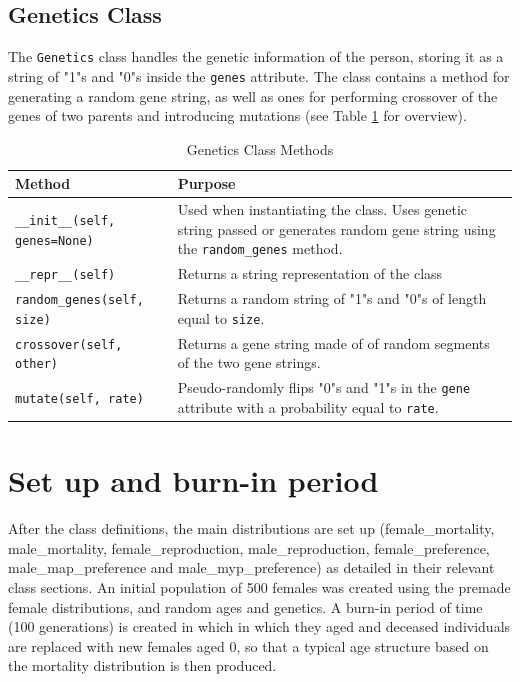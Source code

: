 \documentclass[authoryearcitations]{UoYCSproject}
\begin{document}
\newpage
\subsection{Genetics Class}
The \texttt{Genetics} class handles the genetic information of the person, storing it as a string of "1"s and "0"s inside the \texttt{genes} attribute. The class contains a method for generating a random gene string, as well as ones for performing crossover of the genes of two parents and introducing mutations (see Table \ref{tbl:geneticsMethods} for overview).

\begin{table}[h]
\caption{Genetics Class Methods}
\label{tbl:geneticsMethods}
\begin{tabular}{m{} m{}}
\textbf{Method} & \textbf{Purpose} \\\hline
\texttt{\_\_init\_\_(self, genes=None)} & Used when instantiating the class. Uses genetic string passed or generates random gene string using the \texttt{random\_genes} method.\\\hline
\texttt{\_\_repr\_\_(self)} & Returns a string representation of the class \\\hline
\texttt{random\_genes(self, size)} & Returns a random string of "1"s and "0"s of length equal to \texttt{size}. \\\hline
\texttt{crossover(self, other)} & Returns a gene string made of of random segments of the two gene strings. \\\hline
\texttt{mutate(self, rate)} & Pseudo-randomly flips "0"s and "1"s in the \texttt{gene} attribute with a probability equal to \texttt{rate}.
\end{tabular}
\end{table}

\section{Set up and burn-in period}
After the class definitions, the main distributions are set up (female\_mortality, male\_mortality, female\_reproduction, male\_reproduction, female\_preference, male\_map\_preference and male\_myp\_preference) as detailed in their relevant class sections. An initial population of 500 females was created using the premade female distributions, and random ages and genetics. A burn-in period of time (100 generations) is created in which in which they aged and deceased individuals are replaced with new females aged 0, so that a typical age structure based on the mortality distribution is then produced. 
\end{document}
